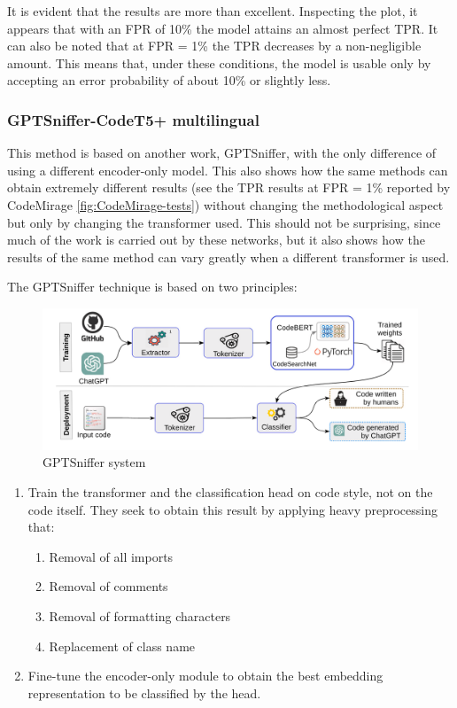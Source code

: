 It is evident that the results are more than excellent. Inspecting the plot, 
it appears that with an FPR of 10\% the model attains an almost perfect TPR. 
It can also be noted that at FPR = 1\% the TPR decreases by a non-negligible 
amount. This means that, under these conditions, the model is usable only by 
accepting an error probability of about 10\% or slightly less.

\subsubsection{GPTSniffer-CodeT5+ multilingual}
This method is based on another work, GPTSniffer\cite{nguyen2024gptsniffer}, 
with the only difference 
of using a different encoder-only model. This also shows how the same methods 
can obtain extremely different results (see the TPR results at FPR = 1\% 
reported by CodeMirage \ref{fig:CodeMirage-tests}) 
without changing the methodological aspect but only by 
changing the transformer used. This should not be surprising, since much of the 
work is carried out by these networks, but it also shows how the results of the 
same method can vary greatly when a different transformer is used.

The GPTSniffer technique is based on two principles:
\begin{figure}[H]
    \centering
    \includegraphics[width=1\textwidth]{img/gptsniffer/system components.png}
    \caption{GPTSniffer system}
    \label{fig:GPTSniffer system}
\end{figure}
\begin{enumerate}
    \item Train the transformer and the classification head on code style, 
    not on the code itself. 
    They seek to obtain this result by applying heavy preprocessing that:   
    \begin{enumerate}
        \item Removal of all imports
        \item Removal of comments
        \item Removal of formatting characters
        \item Replacement of class name
    \end{enumerate}
    \item Fine-tune the encoder-only module to obtain the best embedding 
    representation to be classified by the head.
\end{enumerate}

